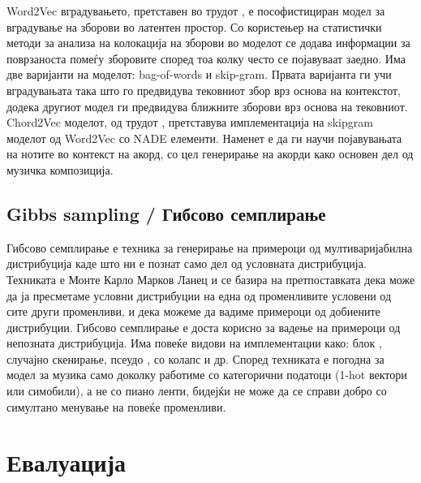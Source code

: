 Word2Vec вградувањето, претставен во трудот \cite{Mikolov2013}, е пософистициран модел за вградување на зборови во латентен простор. Со користењер на статистички методи за анализа на колокација на зборови во моделот се додава информации за поврзаноста помеѓу зборовите според тоа колку често се појавуваат заедно. Има две варијанти на моделот: bag-of-words и skip-gram. Првата варијанта ги учи вградувањата така што го предвидува тековниот збор врз основа на контекстот, додека другиот модел ги предвидува ближните зборови врз основа на тековниот. 
Chord2Vec моделот, од трудот \cite{Madjiheurem2016}, претставува имплементација на skipgram моделот од Word2Vec со NADE елементи. Наменет е да ги научи појавувањата на нотите во контекст на акорд, со цел генерирање на акорди како основен дел од музичка композиција. 

\section{Gibbs sampling / Гибсово семплирање}

Гибсово семплирање е техника за генерирање на примероци од мултиваријабилна дистрибуција каде што ни е познат само дел од условната дистрибуција. Техниката е Монте Карло Марков Ланец и се базира на претпоставката дека може да ја пресметаме условни дистрибуции на една од променливите условени од сите други променливи, и дека можеме да вадиме примероци од добиените дистрибуции. Гибсово семплирање е доста корисно за вадење на примероци од непозната дистрибуција. Има повеќе видови на имплементации како: блок \cite{Boulanger-Lewandowski2012, Goel2014}, случајно скенирање, псеудо \cite{Hadjeres2016}, со колапс и др. Според \cite{Hadjeres2016} техниката е погодна за модел за музика само доколку работиме со категорични податоци (1-hot вектори или симобили), а не со пиано ленти, бидејќи не може да се справи добро со симултано менување на повеќе променливи.

\chapter{Евалуација}
\label{ch:evaluacija}

